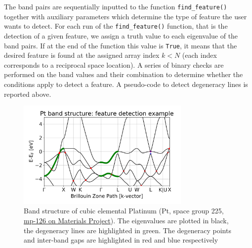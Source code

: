 \documentclass{article}
\begin{document}
The band pairs are sequentially inputted to the function  \texttt{find\_feature()} together with auxiliary parameters which determine the type of feature the user wants to detect. For each run of the \texttt{find\_feature()} function, that is the detection of a given feature, we assign a truth value to each eigenvalue of the band pairs. If at the end of the function this value is \texttt{True}, it means that the desired feature is found at the assigned array index $k < N$ (each index corresponds to a reciprocal space location). A series of binary checks are performed on the band values and their combination to determine whether the conditions apply to detect a feature. A pseudo-code to detect degeneracy lines is reported above.

\begin{figure}[H]
    \centering
    \includegraphics[width=0.75\textwidth]{figures/mp-126_band-structure_features.png}
    \caption{Band structure of cubic elemental Platinum (Pt, space group 225, \href{https://materialsproject.org/materials/mp-126/}{mp-126 on Materials Project}). The eigenvalues are plotted in black, the degeneracy lines are highlighted in green. The degeneracy points and inter-band gaps are highlighted in red and blue respectively}
    \label{fig:feature_detection}
\end{figure}



\end{document}
